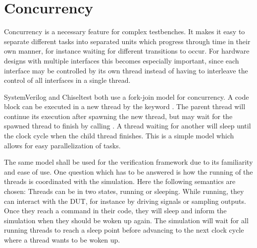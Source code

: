 \section{Concurrency} %

Concurrency is a necessary feature for complex testbenches. It makes it easy to separate different tasks into
separated units which progress through time in their own manner, for instance waiting for different transitions to
occur. For hardware designs with multiple interfaces this becomes especially important, since each interface may be
controlled by its own thread instead of having to interleave the control of all interfaces in a single thread.

SystemVerilog and Chiseltest both use a fork-join model for concurrency. A code block can be executed in a new thread
by the keyword . The parent thread will continue its execution after spawning the new thread, but may wait
for the spawned thread to finish by calling . A thread waiting for another will sleep until the clock cycle
when the child thread finishes. This is a simple model which allows for easy parallelization of tasks.

The same model shall be used for the verification framework due to its familiarity and ease of use. One question
which has to be answered is how the running of the threads is coordinated with the simulation. Here the following
semantics are chosen: Threads can be in two states, running or sleeping. While running, they can interact with the
DUT, for instance by driving signals or sampling outputs. Once they reach a  command in their code, they
will sleep and inform the simulation when they should be woken up again. The simulation will wait for all running
threads to reach a sleep point before advancing to the next clock cycle where a thread wants to be woken up.

